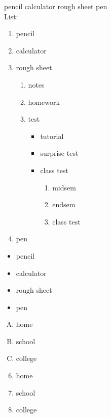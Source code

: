 \documentclass[11pt]{article}
\begin{document}
pencil
calculator
rough sheet
pen\\

List:

\begin{enumerate}
\item pencil
\item calculator
\item rough sheet
	\begin{enumerate}
	\item notes
	\item homework
	\item test
		\begin{itemize}
		\item tutorial
		\item surprise test
		\item class test
			\begin{enumerate}
			\item midsem
			\item endsem
			\item class test
			\end{enumerate}
		\end{itemize}
	\end{enumerate}
\item pen
\end{enumerate}

\begin{itemize}

\item pencil
\item calculator
\item rough sheet
\item pen
\end{itemize}

\begin{enumerate}[A.]
\item home
\item school
\item college

\end{enumerate}

\begin{enumerate}\setcounter{enumi}{5}
\item home
\item school
\item college

\end{enumerate}

\pagebreak
\end{document}
